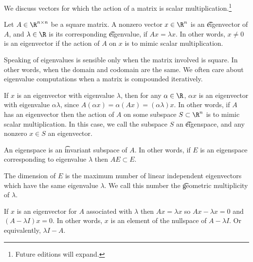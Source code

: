 

We discuss vectors for which the action of a matrix is scalar multiplication.\footnote{Future editions will expand.}


Let $A \in \R^{n \times n}$ be a square matrix.
A nonzero vector $x \in \R^{n}$ is an \t{eigenvector} of $A$, and $\lambda \in \R$ is its corresponding \t{eigenvalue}, if $A x = \lambda x$.
In other words, $x \neq 0$ is an eigenvector if the action of $A$ on $x$ is to mimic scalar multiplication.



Speaking of eigenvalues is sensible only when the matrix involved is square.
In other words, when the domain and codomain are the same.
We often care about eigenvalue computations when a matrix is compounded iteratively.

%


If $x$ is an eigenvector with eigenvalue $\lambda$, then for any $\alpha \in \R$, $\alpha x$ is an eigenvector with eigenvalue $\alpha\lambda$, since $A (\alpha x) = \alpha (Ax) = (\alpha\lambda) x$.
In other words, if $A$ has an eigenvector then the action of $A$ on some subspace $S \subset \R^n$ is to mimic scalar multiplication.
In this case, we call the subspace $S$ an \t{eigenspace}, and any nonzero $x \in S$ an eigenvector.

An eigenspace is an \t{invariant subspace} of $A$.
In other words, if $E$ is an eigenspace corresponding to eigenvalue $\lambda$ then $AE \subset E$.

The dimension of $E$ is the maximum number of linear independent eigenvectors which have the same eigenvalue $\lambda$.
We call this number the \t{geometric multiplicity} of $\lambda$.


If $x$ is an eigenvector for $A$ associated with $\lambda$ then $Ax = \lambda x$ so $Ax - \lambda x = 0$ and $(A - \lambda I)x = 0$.
In other words, $x$ is an element of the nullspace of $A - \lambda I$. Or equivalently, $\lambda I - A$.

